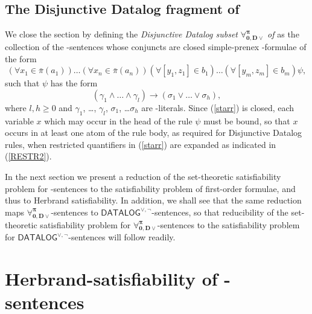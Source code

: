\documentclass[a4paper]{llncs}
\newcommand{\DisjDatalog}{\ensuremath{\mathsf{DATALOG}^{\vee,\neg}}\xspace}
\newcommand{\ForallpizeroDisjDatalog}{\ensuremath{\mathbf{\forall_{0,D\vee}^{\pi}}}\xspace}
\newcommand{\pairin}[3]{\left[#1,#2\right] \in #3}
\newcommand{\nonpairin}[2]{#1 \in \bar{\pi}(#2)}
\newcommand{\red}[1]{\textcolor{red}{#1}}
\begin{document}
\subsection{The Disjunctive Datalog fragment of \Forallpizero}
We close the section by defining the \emph{Disjunctive Datalog subset}
$\ForallpizeroDisjDatalog$\emph{ of }\Forallpizero as the collection
of the \Forallpizero-sentences whose conjuncts are
closed simple-prenex \Forallpizero-formulae
of the form
\begin{equation}\label{starr}
  (\forall \nonpairin{x_1}{a_1})\ldots(\forall 
\nonpairin{x_n}{a_n})(\forall \pairin{y_1}{z_1}{b_1})\ldots(\forall 
\pairin{y_m}{z_m}{b_m})\psi,
\end{equation}
such that $\psi$ has the form
\[
   \left(\gamma_1 \wedge \ldots \wedge \gamma_l\right) \rightarrow
   \left(\sigma_1 \vee \ldots \vee \sigma_h\right) ,
\]
where $l,h \geq 0$ and $\gamma_1$, \ldots, $\gamma_l$, $\sigma_1$,
\ldots $\sigma_h$ are \Forallpizero-literals.  Since (\ref{starr}) is
closed, each variable $x$ which may occur in the head of the rule
$\psi$ must be bound, so that $x$ occurs in at least one atom of the
rule body, as required for Disjunctive Datalog rules, when restricted
quantifiers in (\ref{starr}) are expanded as indicated in
(\ref{RESTR2}).


In the next section we present a reduction of the set-theoretic
satisfiability problem for \Forallpizero-sentences to the satisfiability
problem of first-order formulae, and thus to Herbrand
satisfiability. In addition, we shall see that the same reduction 
maps $\ForallpizeroDisjDatalog$-sentences
to $\DisjDatalog$-sentences, so that reducibility of the set-theoretic
satisfiability problem for $\ForallpizeroDisjDatalog$-sentences to the
satisfiability problem for $\DisjDatalog$-sentences will follow readily.


\section{Herbrand-satisfiability of \Forallpizero-sentences}\label{REDUCTION}

\newcommand{\regf}{\chi_1}
\newcommand{\exonef}{\chi_2}
\newcommand{\extwof}{\chi_3^{(V,T)}}
\newcommand{\eqf}{\chi_4^{(V,T)}}
\end{document}
